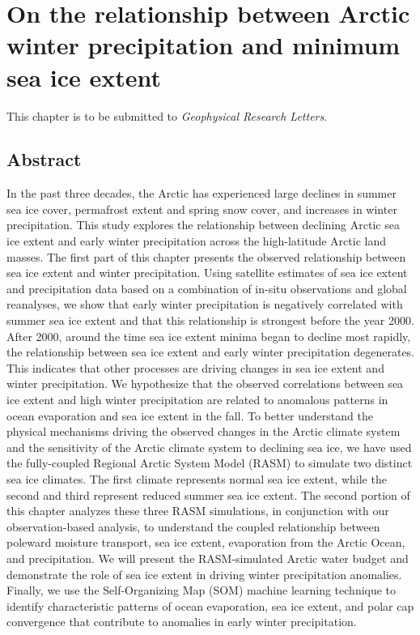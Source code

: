 
\chapter{On the relationship between Arctic winter precipitation and minimum sea ice extent}
\label{chap:winter_prec}

This chapter is to be submitted to \textit{Geophysical Research Letters}.

\section*{Abstract}

In the past three decades, the Arctic has experienced large declines in summer sea ice cover, permafrost extent and spring snow cover, and increases in winter precipitation.
This study explores the relationship between declining Arctic sea ice extent and early winter precipitation across the high-latitude Arctic land masses.
The first part of this chapter presents the observed relationship between sea ice extent and winter precipitation.
Using satellite estimates of sea ice extent and precipitation data based on a combination of in-situ observations and global reanalyses, we show that early winter precipitation is negatively correlated with summer sea ice extent and that this relationship is strongest before the year 2000.
After 2000, around the time sea ice extent minima began to decline most rapidly, the relationship between sea ice extent and early winter precipitation degenerates.
This indicates that other processes are driving changes in sea ice extent and winter precipitation.
We hypothesize that the observed correlations between sea ice extent and high winter precipitation are related to anomalous patterns in ocean evaporation and sea ice extent in the fall.
To better understand the physical mechanisms driving the observed changes in the Arctic climate system and the sensitivity of the Arctic climate system to declining sea ice, we have used the fully-coupled Regional Arctic System Model (RASM) to simulate two distinct sea ice climates.
The first climate represents normal sea ice extent, while the second and third represent reduced summer sea ice extent.
The second portion of this chapter analyzes these three RASM simulations, in conjunction with our observation-based analysis, to understand the coupled relationship between poleward moisture transport, sea ice extent, evaporation from the Arctic Ocean, and precipitation.
We will present the RASM-simulated Arctic water budget and demonstrate the role of sea ice extent in driving winter precipitation anomalies.
Finally, we use the Self-Organizing Map (SOM) machine learning technique to identify characteristic patterns of ocean evaporation, sea ice extent, and polar cap convergence that contribute to anomalies in early winter precipitation.

